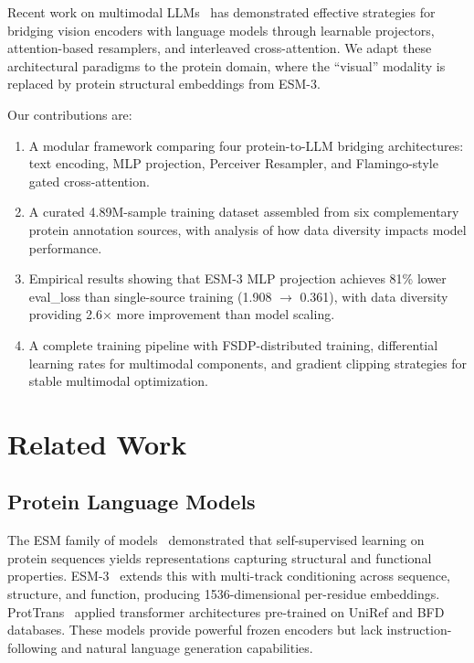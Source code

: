\documentclass[11pt]{article}
\begin{document}
Recent work on multimodal LLMs~\cite{liu2024visual,alayrac2022flamingo} has demonstrated effective strategies for bridging vision encoders with language models through learnable projectors, attention-based resamplers, and interleaved cross-attention. We adapt these architectural paradigms to the protein domain, where the ``visual'' modality is replaced by protein structural embeddings from ESM-3.

Our contributions are:
\begin{enumerate}[leftmargin=*,itemsep=2pt]
    \item A modular framework comparing four protein-to-LLM bridging architectures: text encoding, MLP projection, Perceiver Resampler, and Flamingo-style gated cross-attention.
    \item A curated 4.89M-sample training dataset assembled from six complementary protein annotation sources, with analysis of how data diversity impacts model performance.
    \item Empirical results showing that ESM-3 MLP projection achieves 81\% lower eval\_loss than single-source training (1.908 $\to$ 0.361), with data diversity providing 2.6$\times$ more improvement than model scaling.
    \item A complete training pipeline with FSDP-distributed training, differential learning rates for multimodal components, and gradient clipping strategies for stable multimodal optimization.
\end{enumerate}

\section{Related Work}

\subsection{Protein Language Models}

The ESM family of models~\cite{rives2021biological,lin2023evolutionary,hayes2024simulating} demonstrated that self-supervised learning on protein sequences yields representations capturing structural and functional properties. ESM-3~\cite{hayes2024simulating} extends this with multi-track conditioning across sequence, structure, and function, producing 1536-dimensional per-residue embeddings. ProtTrans~\cite{elnaggar2021prottrans} applied transformer architectures pre-trained on UniRef and BFD databases. These models provide powerful frozen encoders but lack instruction-following and natural language generation capabilities.
\end{document}
